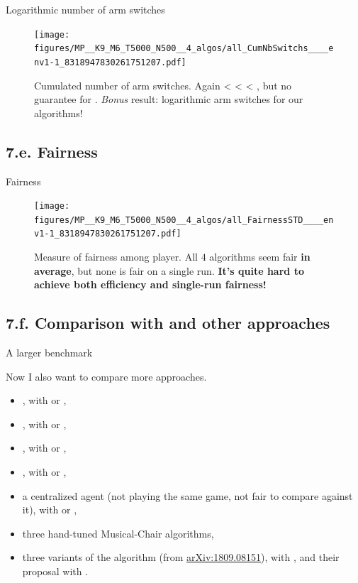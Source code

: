 \documentclass[12pt,english,ignorenonframetext,aspectratio=169,]{beamer}
\providecommand{\tightlist}{%
  \setlength{\itemsep}{0pt}\setlength{\parskip}{0pt}}
\begin{document}
\begin{frame}[plain]{Logarithmic number of arm switches}

\begin{figure}[h!]
\centering
\texttt{[image: figures/MP\_\_K9\_M6\_T5000\_N500\_\_4\_algos/all\_CumNbSwitchs\_\_\_\_env1-1\_8318947830261751207.pdf]}
\caption{\footnotesize{Cumulated number of arm switches. Again \textcolor{blue}{\rhoRand{}} < \textcolor{red}{\RandTopM{}} < \textcolor{bluegreen}{\Selfish{}} < \textcolor{yellowgreen}{\MCTopM{}}, but no guarantee for \textcolor{blue}{\rhoRand{}}. \emph{Bonus} result: logarithmic arm switches for our algorithms!}}
\end{figure}

\end{frame}


\subsection{\hfill{}7.e. Fairness\hfill{}}

\begin{frame}[plain]{Fairness}

\begin{figure}[h!]
\centering
\texttt{[image: figures/MP\_\_K9\_M6\_T5000\_N500\_\_4\_algos/all\_FairnessSTD\_\_\_\_env1-1\_8318947830261751207.pdf]}
\caption{\footnotesize{Measure of fairness among player. All $4$ algorithms seem fair \textbf{in average}, but none is fair on a single run. \textbf{It's quite hard to achieve both efficiency and single-run fairness!}}}
\end{figure}

\end{frame}


\subsection{\hfill{}7.f. Comparison with \SICMMAB{} and other approaches\hfill{}}


\begin{frame}{A larger benchmark}

Now I also want to compare more approaches.

\begin{itemize}\tightlist
  \item \rhoRand, with \UCB{} or \klUCB{},
  \item \RandTopM, with \UCB{} or \klUCB{},
  \item \MCTopM, with \UCB{} or \klUCB{},
  \item \Selfish, with \UCB{} or \klUCB{},
  \item a centralized agent (\alert{not playing the same game, not fair to compare against it}), with \UCB{} or \klUCB{},
  \item three hand-tuned Musical-Chair algorithms,
  \item three variants of the \SICMMAB{} algorithm (from \textcolor{blue}{\href{https://arxiv.org/abs/1809.08151}{arXiv:1809.08151}}), with \UCB, \klUCB{} and their proposal with \UCBH.
\end{itemize}

\end{frame}
\end{document}

